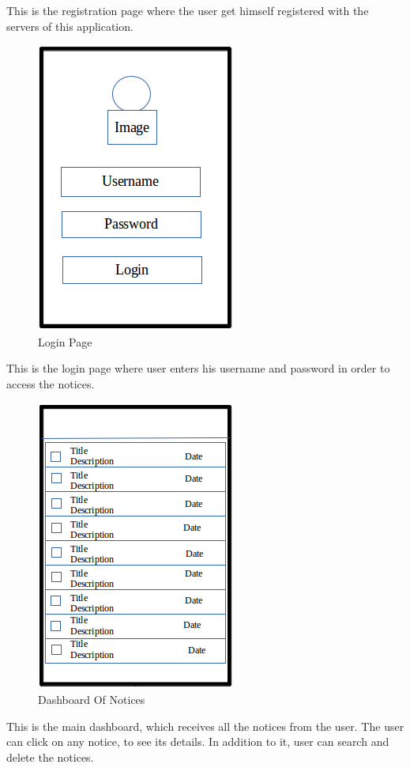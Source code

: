 This is the registration page where the user get himself registered with the servers of this application.

\begin{figure}[H]
\centering \includegraphics[scale=0.5]{image/ui3.png}
\caption{Login Page}
\end{figure}

This is the login page where user enters his username and password in order to access the notices.

\begin{figure}[H]
\centering \includegraphics[scale=0.5]{image/ui4.png}
\caption{Dashboard Of Notices}
\end{figure}

This is the main dashboard, which receives all the notices from the user. The user can click on any notice, to see its details.
In addition to it, user can search and delete the notices.


